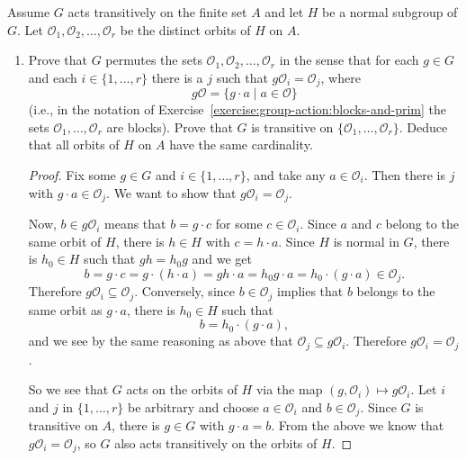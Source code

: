  Assume $G$ acts transitively on the finite set $A$ and let
$H$ be a normal subgroup of $G$. Let
$\mathcal{O}_1, \mathcal{O}_2, \dots, \mathcal{O}_r$ be the distinct
orbits of $H$ on $A$.
\begin{enumerate}
\item Prove that $G$ permutes the sets
  $\mathcal{O}_1,\mathcal{O}_2,\dots,\mathcal{O}_r$ in the sense that
  for each $g\in G$ and each $i\in\{1,\dots,r\}$ there is a $j$ such
  that $g\mathcal{O}_i = \mathcal{O}_j$, where
  \begin{equation*}
    g\mathcal{O} = \{g\cdot a \mid a \in \mathcal{O}\}
  \end{equation*}
  (i.e., in the notation of
  Exercise~\ref{exercise:group-action:blocks-and-prim} the sets
  $\mathcal{O}_1,\dots,\mathcal{O}_r$ are blocks). Prove that $G$ is
  transitive on $\{\mathcal{O}_1,\dots,\mathcal{O}_r\}$. Deduce that
  all orbits of $H$ on $A$ have the same cardinality.
  \begin{proof}
    Fix some $g\in G$ and $i\in\{1,\dots,r\}$, and take any
    $a\in\mathcal{O}_i$. Then there is $j$ with
    $g\cdot a\in\mathcal{O}_j$. We want to show that
    $g\mathcal{O}_i = \mathcal{O}_j$.

    Now, $b\in g\mathcal{O}_i$ means that $b = g\cdot c$ for some
    $c\in\mathcal{O}_i$. Since $a$ and $c$ belong to the same orbit of
    $H$, there is $h\in H$ with $c = h\cdot a$. Since $H$ is normal in
    $G$, there is $h_0\in H$ such that $gh = h_0g$ and we get
    \begin{equation*}
      b = g\cdot c = g\cdot(h\cdot a)
      = gh\cdot a = h_0g\cdot a
      = h_0\cdot(g\cdot a) \in \mathcal{O}_j.
    \end{equation*}
    Therefore $g\mathcal{O}_i\subseteq\mathcal{O}_j$. Conversely,
    since $b\in\mathcal{O}_j$ implies that $b$ belongs to the same
    orbit as $g\cdot a$, there is $h_0\in H$ such that
    \begin{equation*}
      b = h_0\cdot(g\cdot a),
    \end{equation*}
    and we see by the same reasoning as above that
    $\mathcal{O}_j\subseteq g\mathcal{O}_i$. Therefore
    $g\mathcal{O}_i = \mathcal{O}_j$.

    So we see that $G$ acts on the orbits of $H$ via the map
    $(g,\mathcal{O}_i)\mapsto g\mathcal{O}_i$. Let $i$ and $j$ in
    $\{1,\dots,r\}$ be arbitrary and choose $a\in\mathcal{O}_i$ and
    $b\in\mathcal{O}_j$. Since $G$ is transitive on $A$, there is
    $g\in G$ with $g\cdot a = b$. From the above we know that
    $g\mathcal{O}_i = \mathcal{O}_j$, so $G$ also acts transitively on
    the orbits of $H$.


\end{proof}
\end{enumerate}
